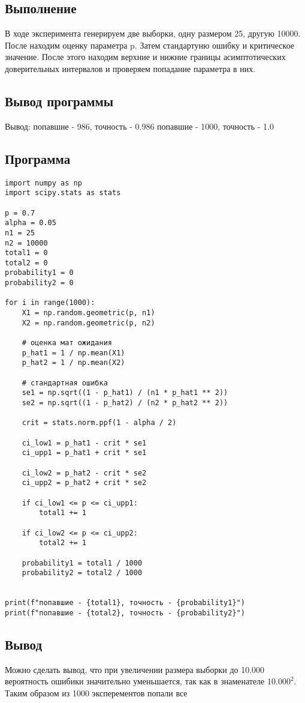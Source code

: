 \documentclass{article}
\begin{document}
\subsection{Выполнение}
В ходе эксперимента генерируем две выборки, одну размером 25, другую 10000. После находим оценку параметра p. Затем стандартуню ошибку и критическое значение. После этого находим верхние и нижние границы асимптотических доверительных интервалов и проверяем попадание параметра в них.

\subsection{Вывод программы}
Вывод:\newline
попавшие - 986, точность - 0.986\newline
попавшие - 1000, точность - 1.0

\subsection{Программа}
\begin{verbatim}
import numpy as np
import scipy.stats as stats

p = 0.7
alpha = 0.05
n1 = 25
n2 = 10000
total1 = 0
total2 = 0
probability1 = 0
probability2 = 0

for i in range(1000):
    X1 = np.random.geometric(p, n1)
    X2 = np.random.geometric(p, n2)

    # оценка мат ожидания
    p_hat1 = 1 / np.mean(X1)
    p_hat2 = 1 / np.mean(X2)

    # стандартная ошибка
    se1 = np.sqrt((1 - p_hat1) / (n1 * p_hat1 ** 2))
    se2 = np.sqrt((1 - p_hat2) / (n2 * p_hat2 ** 2))

    crit = stats.norm.ppf(1 - alpha / 2)

    ci_low1 = p_hat1 - crit * se1
    ci_upp1 = p_hat1 + crit * se1

    ci_low2 = p_hat2 - crit * se2
    ci_upp2 = p_hat2 + crit * se2

    if ci_low1 <= p <= ci_upp1:
        total1 += 1

    if ci_low2 <= p <= ci_upp2:
        total2 += 1

    probability1 = total1 / 1000
    probability2 = total2 / 1000


print(f"попавшие - {total1}, точность - {probability1}")
print(f"попавшие - {total2}, точность - {probability2}")
\end{verbatim}

\subsection{Вывод}
Можно сделать вывод, что при увеличении размера выборки до 10.000 вероятность ошибики значительно уменьшается, так как в знаменателе $10.000 ^ 2$. Таким образом из 1000 эксперементов попали все
\end{document}
